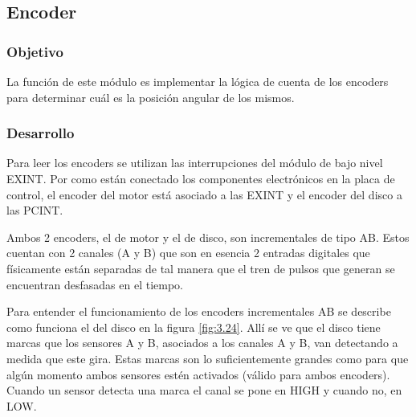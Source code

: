 \subsection{Encoder}
\subsubsection{Objetivo}
La función de este módulo es implementar la lógica de cuenta de los encoders para determinar cuál es la posición angular de los mismos.

\subsubsection{Desarrollo}
Para leer los encoders se utilizan las interrupciones del módulo de bajo nivel EXINT. Por como están conectado los componentes electrónicos en la placa de control, el encoder del motor está asociado a las EXINT y el encoder del disco a las PCINT.

Ambos 2 encoders, el de motor y el de disco, son incrementales de tipo AB. Estos cuentan con 2 canales (A y B) que son en esencia 2 entradas digitales que físicamente están separadas de tal manera que el tren de pulsos que generan se encuentran desfasadas en el tiempo. 

Para entender el funcionamiento de los encoders incrementales AB se describe como funciona el del disco en la figura \ref{fig:3.24}. Allí se ve que el disco tiene marcas que los sensores A y B, asociados a los canales A y B, van detectando a medida que este gira. Estas marcas son lo suficientemente grandes como para que algún momento ambos sensores estén activados (válido para ambos encoders). Cuando un sensor detecta una marca el canal se pone en HIGH y cuando no, en LOW.

